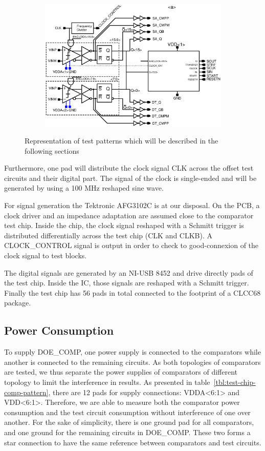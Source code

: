 \begin{figure}[htp]
\begin{subfigure}[b]{0.75\textwidth}
        \includegraphics[width=\textwidth]{Chapter5/Figs/comp_test/test_offset_conv_bloc.ps}
    \end{subfigure}
    \caption{Representation of test patterns which will be described in the following sections}
    \label{fig:test-chip-comp-patterns}
\end{figure}

Furthermore, one pad will distribute the clock signal CLK across the offset test circuits and their digital part. The signal of the clock is single-ended and will be generated by using a 100 MHz reshaped sine wave.

For signal generation the Tektronic AFG3102C is at our disposal. On the PCB, a clock driver and an impedance adaptation are assumed close to the comparator test chip. Inside the chip, the clock signal reshaped with a Schmitt trigger is distributed differentially across the test chip (CLK and CLKB). A CLOCK\_CONTROL signal is output in order to check to good-connexion of the clock signal to test blocks.

The digital signals are generated by an NI-USB 8452 and drive directly pads of the test chip. Inside the IC, those signals are reshaped with a Schmitt trigger. Finally the test chip has 56 pads in total connected to the footprint of a CLCC68 package.

\subsection{Power Consumption}
To supply DOE\_COMP, one power supply is connected to the comparators while another is connected to the remaining circuits.
As both topologies of comparators are tested, we thus separate the power supplies of comparators of different topology to limit the interference in results. As presented in table~\ref{tbl:test-chip-comp-pattern}, there are 12 pads for supply connections: VDDA<6:1> and VDD<6:1>. Therefore, we are able to measure both the comparator power consumption and the test circuit consumption without interference of one over another. For the sake of simplicity, there is one ground pad for all comparators, and one ground for the remaining circuits in DOE\_COMP. These two forms a star connection to have the same reference between comparators and test circuits.

